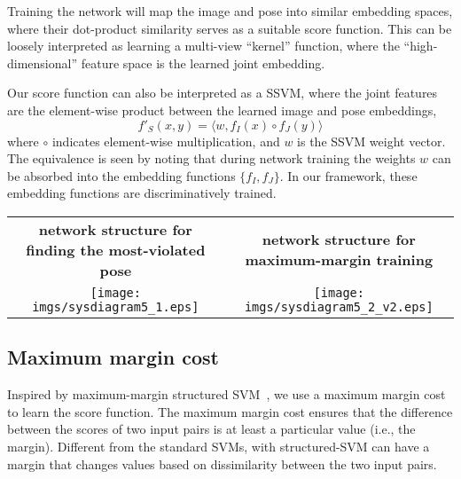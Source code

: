 \documentclass[10pt,twocolumn,letterpaper]{article}
\begin{document}
Training the network will map the image and pose into similar embedding spaces, where their dot-product similarity serves as a suitable score function. This can be loosely interpreted as learning a multi-view ``kernel'' function, where the ``high-dimensional'' feature space is the learned joint embedding.



Our score function can also be interpreted as a %
SSVM, where the joint features
are the element-wise product between the learned image and pose embeddings, 
\begin{equation}
  f'_{S}(x,y) = \langle w, f_{I}(x) \circ f_{J}(y) \rangle
\end{equation}
where $\circ$ indicates element-wise multiplication, and  $w$ is the SSVM weight vector.  
The equivalence is seen by noting that during network training the  weights $w$ can be absorbed into the embedding functions $\{f_I, f_J\}$.
In our framework, these embedding functions are discriminatively trained.
 

\begin{figure*}[t]
\begin{center}     
\begin{tabular}{c|c}{\footnotesize \bf network structure for finding the most-violated pose}
&
{\footnotesize \bf network structure for maximum-margin training}
\\
   \texttt{[image: imgs/sysdiagram5\_1.eps]}
   &
  \texttt{[image: imgs/sysdiagram5\_2\_v2.eps]}
\end{tabular} 
\end{center}  
\vspace{-0.15in}
   \caption{(left) Network structure for calculating the most violated pose.  For a given image, the score values are predicted for a set of candidate poses.  The re-scaling margin values are added, and the largest value is selected as the most-violated pose. Thick arrows represent an array of outputs, with each entry corresponding to one candidate pose.
 (right) Network structure for maximum-margin training. Given the most-violated pose, the margin cost and pose prediction cost are calculated, and the gradients are passed back through the network.}
\label{fig:trainnet}
\vspace{-0.15in}
\end{figure*}
 

\subsection{Maximum margin cost}
\vspace{-0.05in}
Inspired by maximum-margin structured SVM~\cite{ssvm2005}, we use a maximum margin cost to learn the score function.
The maximum margin cost ensures that the difference between the scores of two input pairs is at least a particular value (i.e., the margin). Different from the standard SVMs, with structured-SVM can have a margin that changes values based on dissimilarity between the two input pairs.
\end{document}
